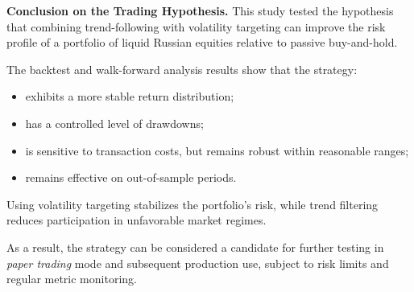 \documentclass[12pt]{article}
\begin{document}
\textbf{Conclusion on the Trading Hypothesis.}
This study tested the hypothesis that combining trend-following with volatility targeting can improve the risk profile of a portfolio of liquid Russian equities relative to passive buy-and-hold.

The backtest and walk-forward analysis results show that the strategy:
\begin{itemize}
    \item exhibits a more stable return distribution;
    \item has a controlled level of drawdowns;
    \item is sensitive to transaction costs, but remains robust within reasonable ranges;
    \item remains effective on out-of-sample periods.
\end{itemize}

Using volatility targeting stabilizes the portfolio's risk, while trend filtering reduces participation in unfavorable market regimes.

As a result, the strategy can be considered a candidate for further testing in \textit{paper trading} mode and subsequent production use, subject to risk limits and regular metric monitoring.
\end{document}
